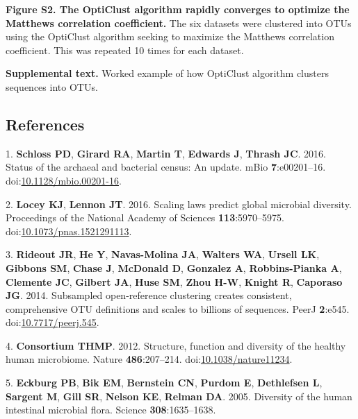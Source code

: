 \documentclass[11pt,]{article}
\begin{document}
\textbf{Figure S2. The OptiClust algorithm rapidly converges to optimize
the Matthews correlation coefficient.} The six datasets were clustered
into OTUs using the OptiClust algorithm seeking to maximize the Matthews
correlation coefficient. This was repeated 10 times for each dataset.

\textbf{Supplemental text.} Worked example of how OptiClust algorithm
clusters sequences into OTUs.

\newpage

\subsection*{References}\label{references}

\hypertarget{refs}{}
\hypertarget{ref-Schloss2016b}{}
1. \textbf{Schloss PD}, \textbf{Girard RA}, \textbf{Martin T},
\textbf{Edwards J}, \textbf{Thrash JC}. 2016. Status of the archaeal and
bacterial census: An update. mBio \textbf{7}:e00201--16.
doi:\href{https://doi.org/10.1128/mbio.00201-16}{10.1128/mbio.00201-16}.

\hypertarget{ref-Locey2016}{}
2. \textbf{Locey KJ}, \textbf{Lennon JT}. 2016. Scaling laws predict
global microbial diversity. Proceedings of the National Academy of
Sciences \textbf{113}:5970--5975.
doi:\href{https://doi.org/10.1073/pnas.1521291113}{10.1073/pnas.1521291113}.

\hypertarget{ref-Rideout2014}{}
3. \textbf{Rideout JR}, \textbf{He Y}, \textbf{Navas-Molina JA},
\textbf{Walters WA}, \textbf{Ursell LK}, \textbf{Gibbons SM},
\textbf{Chase J}, \textbf{McDonald D}, \textbf{Gonzalez A},
\textbf{Robbins-Pianka A}, \textbf{Clemente JC}, \textbf{Gilbert JA},
\textbf{Huse SM}, \textbf{Zhou H-W}, \textbf{Knight R}, \textbf{Caporaso
JG}. 2014. Subsampled open-reference clustering creates consistent,
comprehensive OTU definitions and scales to billions of sequences. PeerJ
\textbf{2}:e545.
doi:\href{https://doi.org/10.7717/peerj.545}{10.7717/peerj.545}.

\hypertarget{ref-Huttenhower2012}{}
4. \textbf{Consortium THMP}. 2012. Structure, function and diversity of
the healthy human microbiome. Nature \textbf{486}:207--214.
doi:\href{https://doi.org/10.1038/nature11234}{10.1038/nature11234}.

\hypertarget{ref-Eckburg2005}{}
5. \textbf{Eckburg PB}, \textbf{Bik EM}, \textbf{Bernstein CN},
\textbf{Purdom E}, \textbf{Dethlefsen L}, \textbf{Sargent M},
\textbf{Gill SR}, \textbf{Nelson KE}, \textbf{Relman DA}. 2005.
Diversity of the human intestinal microbial flora. Science
\textbf{308}:1635--1638.
\end{document}
